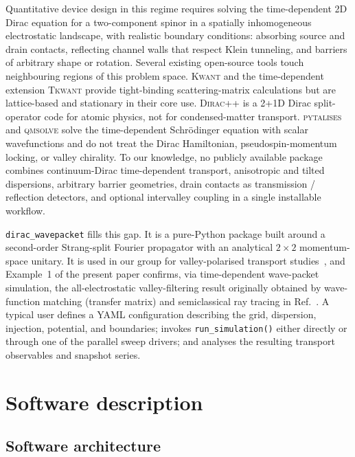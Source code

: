 \documentclass[preprint, 12pt, a4paper]{elsarticle}
\newcommand{\dirac}{\texttt{dirac\_wavepacket}\xspace}
\begin{document}
Quantitative device design in this regime requires solving the
time-dependent 2D Dirac equation for a two-component spinor in a
spatially inhomogeneous electrostatic landscape, with realistic
boundary conditions: absorbing source and drain contacts, reflecting
channel walls that respect Klein tunneling, and barriers of arbitrary
shape or rotation. Several existing open-source tools touch
neighbouring regions of this problem space. \textsc{Kwant}
\cite{Groth2014} and the time-dependent extension \textsc{Tkwant}
\cite{Kloss2021} provide tight-binding scattering-matrix calculations
but are lattice-based and stationary in their core use. \textsc{Dirac++}
\cite{Mocken2008} is a 2+1D Dirac split-operator code for atomic
physics, not for condensed-matter transport. \textsc{pytalises}
\cite{pytalises} and \textsc{qmsolve} \cite{qmsolve} solve the
time-dependent Schr\"odinger equation with scalar wavefunctions and
do not treat the Dirac Hamiltonian, pseudospin-momentum locking, or
valley chirality. To our knowledge, no publicly available package
combines continuum-Dirac time-dependent transport, anisotropic and
tilted dispersions, arbitrary barrier geometries, drain contacts as
transmission / reflection detectors, and optional intervalley
coupling in a single installable workflow.

\dirac fills this gap. It is a pure-Python package built around a
second-order Strang-split Fourier propagator with an analytical
$2\times2$ momentum-space unitary. It is used in our group for
valley-polarised transport studies~\cite{Yesilyurt2026phasegate},
and Example~1 of the present paper confirms, via time-dependent
wave-packet simulation, the all-electrostatic valley-filtering
result originally obtained by wave-function matching (transfer
matrix) and semiclassical ray tracing in
Ref.~\cite{Yesilyurt2026valleyfilter}. A typical user defines a
YAML configuration describing the grid, dispersion, injection,
potential, and boundaries; invokes \texttt{run\_simulation()}
either directly or through one of the parallel sweep drivers; and
analyses the resulting transport observables and snapshot series.

\section{Software description}
\label{sec:software}

\subsection{Software architecture}
\end{document}
